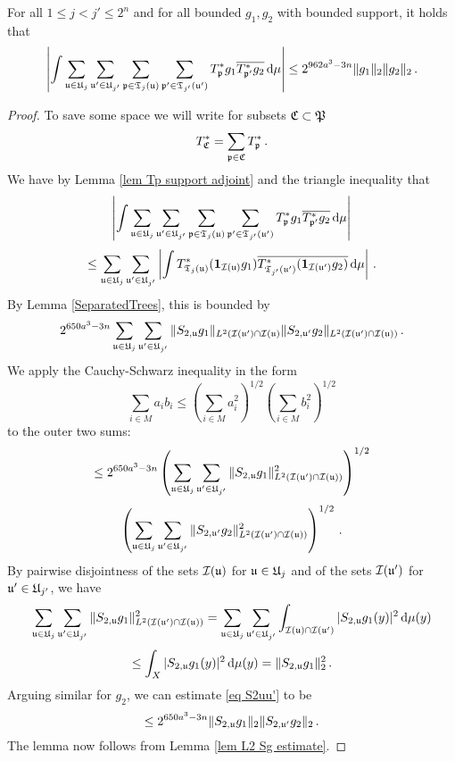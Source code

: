 {\begin{lemma}
    \label{lem sep row bound}
    For all $1 \le j < j' \le 2^n$ and for all bounded $g_1, g_2$ with bounded support, it holds that
    $$
        \left| \int \sum_{\mathfrak u \in \mathfrak U_j} \sum_{\mathfrak u' \in \mathfrak U_{j'}} \sum_{\mathfrak p \in \mathfrak T_j(\mathfrak u)} \sum_{\mathfrak p' \in \mathfrak T_{j'}(\mathfrak u')} T^*_{\mathfrak p} g_1 \overline{T^*_{\mathfrak p'} g_2} \, \mathrm{d}\mu \right| \le
        2^{962a^3-3n}\|g_1\|_2 \|g_2\|_2\,.
    $$
\end{lemma}

\begin{proof}
    To save some space we will write for subsets $\mathfrak C \subset \mathfrak P$
    $$
        T_{\mathfrak C}^* = \sum_{\mathfrak p \in \mathfrak C} T_{\mathfrak p}^*\,.
    $$
    We have by Lemma \ref{lem Tp support adjoint} and the triangle inequality that
    $$
        \left| \int \sum_{\mathfrak u \in \mathfrak U_j} \sum_{\mathfrak u' \in \mathfrak U_{j'}} \sum_{\mathfrak p \in \mathfrak T_j(\mathfrak u)} \sum_{\mathfrak p' \in \mathfrak T_{j'}(\mathfrak u')} T^*_{\mathfrak p} g_1 \overline{T^*_{\mathfrak p'} g_2} \, \mathrm{d}\mu \right|
    $$
    $$
        \le   \sum_{\mathfrak u \in \mathfrak U_j} \sum_{\mathfrak u' \in \mathfrak U_{j'}} \left| \int   T^*_{\mathfrak T_j(\mathfrak u)} (\mathbf{1}_{\mathcal{I}(\mathfrak u)} g_1) \overline{T^*_{\mathfrak T_{j'}(\mathfrak u')} (\mathbf{1}_{\mathcal{I}(\mathfrak u')} g_2)} \, \mathrm{d}\mu \right|\,.
    $$
    By Lemma \ref{SeparatedTrees}, this is bounded by
    \begin{equation}
        \label{eq S2uu'}
         2^{650a^3-3n} \sum_{\mathfrak u \in \mathfrak U_j} \sum_{\mathfrak u' \in \mathfrak U_{j'}} \|S_{2,\mathfrak u} g_1\|_{L^2(\mathcal{I}(\mathfrak u')\cap \mathcal{I}(\mathfrak u)} \|S_{2, \mathfrak u'} g_2\|_{L^2(\mathcal{I}(\mathfrak u')\cap\mathcal{I}(\mathfrak u))}\,.
    \end{equation}
    We apply the Cauchy-Schwarz inequality in the form
    \begin{equation*}
        \sum_{i \in M} a_i b_i \le (\sum_{i \in M} a_i^2 )^{1/2}(\sum_{i \in M} b_i^2 )^{1/2}
    \end{equation*} to the outer two sums:
    $$
        \le 2^{650a^3-3n} \left(\sum_{\mathfrak u \in \mathfrak U_j} \sum_{\mathfrak u' \in \mathfrak U_{j'}} \|S_{2,\mathfrak u} g_1\|_{L^2(\mathcal{I}(\mathfrak u')\cap \mathcal{I}(\mathfrak u))}^2 \right)^{1/2}
    $$
    $$
        \left(\sum_{\mathfrak u \in \mathfrak U_j} \sum_{\mathfrak u' \in \mathfrak U_{j'}} \|S_{2,\mathfrak u'} g_2\|_{L^2(\mathcal{I}(\mathfrak u')\cap\mathcal{I}(\mathfrak u))}^2 \right)^{1/2}\,.
    $$
    By pairwise disjointness of the sets $\mathcal{I}(\mathfrak u)$ for $\mathfrak u \in \mathfrak U_j$ and of the sets $\mathcal{I}(\mathfrak u')$ for $\mathfrak u' \in \mathfrak U_{j'}$, we have
    $$
        \sum_{\mathfrak u \in \mathfrak U_j}\sum_{\mathfrak u' \in \mathfrak U_{j'}} \|S_{2,\mathfrak u} g_1\|_{L^2(\mathcal{I}(\mathfrak u')\cap \mathcal{I}(\mathfrak u))}^2
        = \sum_{\mathfrak u \in \mathfrak U_j}\sum_{\mathfrak u' \in \mathfrak U_{j'}} \int_{\mathcal{I}(\mathfrak u) \cap \mathcal{I}(\mathfrak u')} |S_{2,\mathfrak u} g_1(y)|^2 \, \mathrm{d}\mu(y)
    $$
    $$
        \le \int_X |S_{2,\mathfrak u}g_1(y)|^2 \, \mathrm{d}\mu(y) = \|S_{2,\mathfrak u} g_1\|_2^2\,.
    $$
    Arguing similar for $g_2$, we can estimate \eqref{eq S2uu'} to be
    $$
        \le 2^{650a^3-3n} \|S_{2,\mathfrak u}g_1\|_2 \|S_{2,\mathfrak u'} g_2\|_2\,.
    $$
    The lemma now follows from Lemma \ref{lem L2 Sg estimate}.
\end{proof}

}
